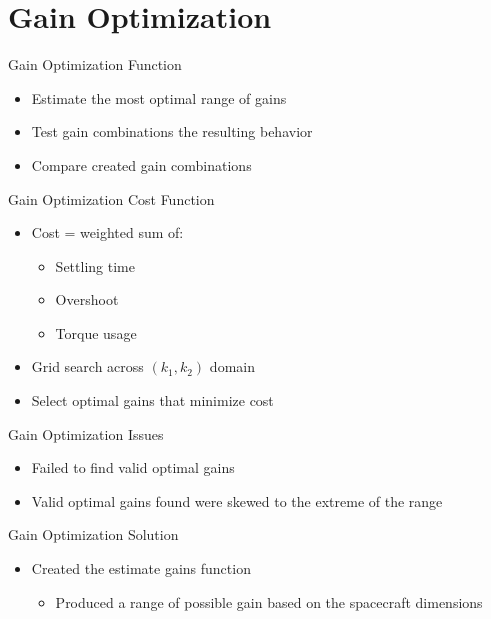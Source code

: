 \documentclass{beamer}
\begin{document}
\section{Gain Optimization}
\begin{frame}{Gain Optimization Function}
    \begin{itemize}
        \item Estimate the most optimal range of gains
        \item Test gain combinations the resulting behavior
        \item Compare created gain combinations
    \end{itemize}
\end{frame}


\begin{frame}{Gain Optimization Cost Function}
\begin{itemize}
  \item Cost = weighted sum of:
  \begin{itemize}
    \item Settling time
    \item Overshoot
    \item Torque usage
  \end{itemize}
  \item Grid search across $(k_1, k_2)$ domain
  \item Select optimal gains that minimize cost
\end{itemize}
\end{frame}


\begin{frame}{Gain Optimization Issues}
\begin{itemize}
  \item Failed to find valid optimal gains 
  \item Valid optimal gains found were skewed to the extreme of the range
\end{itemize}
\end{frame}

\begin{frame}{Gain Optimization Solution}
\begin{itemize}
  \item Created the estimate gains function
  \begin{itemize}
      \item Produced a range of possible gain based on the spacecraft dimensions
  \end{itemize}
\end{itemize}
\end{frame}
\end{document}

